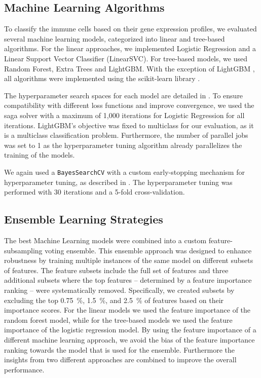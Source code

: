 \documentclass[11pt]{article}
\begin{document}


\subsection{Machine Learning Algorithms}\label{sec:methods:machine-learning}

To classify the immune cells based on their gene expression profiles, we evaluated several machine learning models, categorized into linear and tree-based algorithms. For the linear approaches, we implemented Logistic Regression and a Linear Support Vector Classifier (LinearSVC). For tree-based models, we used Random Forest, Extra Trees and LightGBM. With the exception of LightGBM \cite{NIPS2017_6449f44a}, all algorithms were implemented using the scikit-learn library \cite{sklearn}.

The hyperparameter search spaces for each model are detailed in . To ensure compatibility with different loss functions and improve convergence, we used the saga solver with a maximum of 1,000 iterations for Logistic Regression for all iterations. LightGBM's objective was fixed to multiclass for our evaluation, as it is a multiclass classification problem. Furthermore, the number of parallel jobs was set to 1 as the hyperparameter tuning algorithm already parallelizes the training of the models.

We again used a \texttt{BayesSearchCV} with a custom early-stopping mechanism for hyperparameter tuning, as described in . The hyperparameter tuning was performed with 30 iterations and a 5-fold cross-validation.


\subsection{Ensemble Learning Strategies}\label{sec:methods:ensemble-learning}

The best Machine Learning models were combined into a custom feature-subsampling voting ensemble. This ensemble approach was designed to enhance robustness by training multiple instances of the same model on different subsets of features. The feature subsets include the full set of features and three additional subsets where the top features -- determined by a feature importance ranking -- were systematically removed. Specifically, we created subsets by excluding the top 0.75~\%, 1.5~\%, and 2.5~\% of features based on their importance scores.
For the linear models we used the feature importance of the random forest model, while for the tree-based models we used the feature importance of the logistic regression model. 
By using the feature importance of a different machine learning approach, we avoid the bias of the feature importance ranking towards the model that is used for the ensemble. Furthermore the insights from two different approaches are combined to improve the overall performance.
\end{document}
